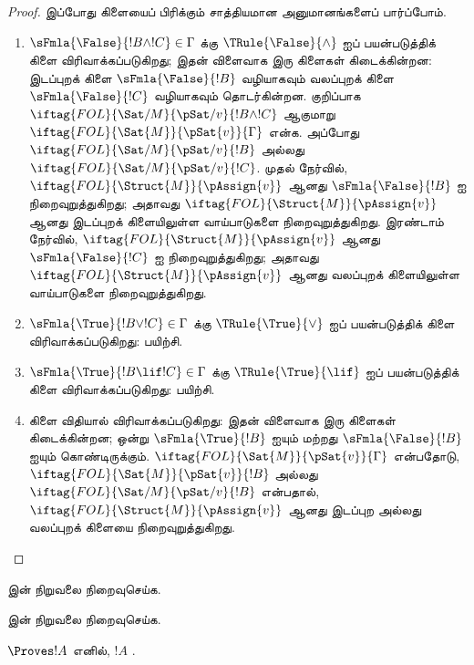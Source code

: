 \documentclass[../../../include/open-logic-section]{subfiles}
\begin{document}
\begin{proof}
இப்போது கிளையைப் பிரிக்கும் சாத்தியமான அனுமானங்களைப் பார்ப்போம்.
\begin{enumerate}
\item $\sFmla{\False}{!B \land !C} \in \Gamma$ க்கு
  $\TRule{\False}{\land}$ ஐப் பயன்படுத்திக் கிளை விரிவாக்கப்படுகிறது;
  இதன் விளைவாக இரு கிளைகள் கிடைக்கின்றன: இடப்புறக் கிளை
  $\sFmla{\False}{!B}$ வழியாகவும் வலப்புறக் கிளை
  $\sFmla{\False}{!C}$ வழியாகவும் தொடர்கின்றன. குறிப்பாக
  $\iftag{FOL}{\Sat/{M}}{\pSat/{v}}{!B \land !C}$ ஆகுமாறு
  $\iftag{FOL}{\Sat{M}}{\pSat{v}}{\Gamma}$ என்க. அப்போது
  $\iftag{FOL}{\Sat/{M}}{\pSat/{v}}{!B}$ அல்லது
  $\iftag{FOL}{\Sat/{M}}{\pSat/{v}}{!C}$. முதல் நேர்வில்,
  $\iftag{FOL}{\Struct{M}}{\pAssign{v}}$ ஆனது
  $\sFmla{\False}{!B}$ ஐ நிறைவுறுத்துகிறது; அதாவது
  $\iftag{FOL}{\Struct{M}}{\pAssign{v}}$ ஆனது இடப்புறக் கிளையிலுள்ள
  வாய்பாடுகளை நிறைவுறுத்துகிறது. இரண்டாம் நேர்வில்,
  $\iftag{FOL}{\Struct{M}}{\pAssign{v}}$ ஆனது
  $\sFmla{\False}{!C}$ ஐ நிறைவுறுத்துகிறது; அதாவது
  $\iftag{FOL}{\Struct{M}}{\pAssign{v}}$ ஆனது வலப்புறக் கிளையிலுள்ள
  வாய்பாடுகளை நிறைவுறுத்துகிறது.
\item $\sFmla{\True}{!B \lor !C} \in \Gamma$ க்கு
  $\TRule{\True}{\lor}$ ஐப் பயன்படுத்திக் கிளை விரிவாக்கப்படுகிறது:
  பயிற்சி.
\item $\sFmla{\True}{!B \lif !C} \in \Gamma$ க்கு
  $\TRule{\True}{\lif}$ ஐப் பயன்படுத்திக் கிளை விரிவாக்கப்படுகிறது:
  பயிற்சி.
\item கிளை \Cut{} விதியால் விரிவாக்கப்படுகிறது: இதன் விளைவாக இரு கிளைகள்
  கிடைக்கின்றன; ஒன்று $\sFmla{\True}{!B}$ ஐயும் மற்றது
  $\sFmla{\False}{!B}$ ஐயும் கொண்டிருக்கும்.
  $\iftag{FOL}{\Sat{M}}{\pSat{v}}{\Gamma}$ என்பதோடு,
  $\iftag{FOL}{\Sat{M}}{\pSat{v}}{!B}$ அல்லது
  $\iftag{FOL}{\Sat/{M}}{\pSat/{v}}{!B}$ என்பதால்,
  $\iftag{FOL}{\Struct{M}}{\pAssign{v}}$ ஆனது இடப்புற அல்லது வலப்புறக்
  கிளையை நிறைவுறுத்துகிறது.
\end{enumerate}
\end{proof}

\begin{prob}
 இன் நிறுவலை நிறைவுசெய்க.
\end{prob}
\tagendprob

\begin{prob}
 இன் நிறுவலை நிறைவுசெய்க.
\end{prob}
\tagendprob

\begin{cor}
$\Proves !A$ எனில், $!A$ .
\end{cor}
\end{document}
